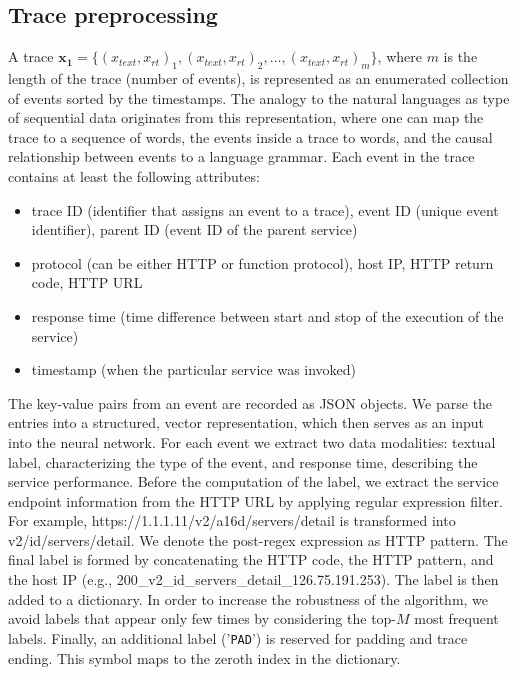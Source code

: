 \subsection{Trace preprocessing}\label{datarepresentation}

A trace $\mathbf{x_{1}}=\{(x_{text}, x_{rt})_1, (x_{text}, x_{rt})_2, \dots, (x_{text}, x_{rt})_m\}$, where $m$ is the length of the trace (number of events), is represented as an enumerated collection of events sorted by the timestamps. The analogy to the natural languages as type of sequential data originates from this representation, where one can map the trace to a sequence of words, the events inside a trace to words, and the causal relationship between events to a language grammar. Each event in the trace contains at least the following attributes: 
\begin{itemize}
\item trace ID (identifier that assigns an event to a trace), event ID (unique event identifier), parent ID (event ID of the parent service) 
\item protocol (can be either HTTP or function protocol), host IP, HTTP return code, HTTP URL
\item response time (time difference between start and stop of the execution of the service)
\item timestamp (when the particular service was invoked)
\end{itemize}

The key-value pairs from an event are recorded as JSON objects. We parse the entries into a structured, vector representation, which then serves as an input into the neural network. For each event we extract two data modalities: textual label, characterizing the type of the event, and response time, describing the service performance. Before the computation of the label, we extract the service endpoint information from the HTTP URL by applying regular expression filter. For example, \textsf{\small https://1.1.1.11/v2/a16d/servers/detail} is transformed into \textsf{\small v2/id/servers/detail}. We denote the post-regex expression as HTTP pattern. The final label is formed by concatenating the HTTP code, the HTTP pattern, and the host IP (e.g., \textsf{\small 200\_v2\_id\_servers\_detail\_126.75.191.253}). The label is then added to a dictionary. In order to increase the robustness of the algorithm, we avoid labels that appear only few times by considering the top-$M$ most frequent labels. Finally, an additional label ('\texttt{PAD}') is reserved for padding and trace ending. This symbol maps to the zeroth index in the dictionary.

